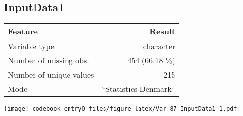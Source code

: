 \documentclass[]{article}
\newcommand{\fullline}{\noindent\makebox[\linewidth]{\rule{\textwidth}{0.4pt}}}
\newcommand{\bminione}{\begin{minipage}{0.75 \textwidth}}
\newcommand{\bminitwo}{\begin{minipage}{0.25 \textwidth}}
\newcommand{\emini}{\end{minipage}}
\begin{document}
\fullline

\hypertarget{inputdata1}{\subsection{InputData1}\label{inputdata1}}

\bminione

\begin{longtable}[]{@{}lr@{}}
\toprule
\begin{minipage}[b]{0.34\columnwidth}\raggedright\strut
Feature\strut
\end{minipage} & \begin{minipage}[b]{0.29\columnwidth}\raggedleft\strut
Result\strut
\end{minipage}\tabularnewline
\midrule
\endhead
\begin{minipage}[t]{0.34\columnwidth}\raggedright\strut
Variable type\strut
\end{minipage} & \begin{minipage}[t]{0.29\columnwidth}\raggedleft\strut
character\strut
\end{minipage}\tabularnewline
\begin{minipage}[t]{0.34\columnwidth}\raggedright\strut
Number of missing obs.\strut
\end{minipage} & \begin{minipage}[t]{0.29\columnwidth}\raggedleft\strut
454 (66.18 \%)\strut
\end{minipage}\tabularnewline
\begin{minipage}[t]{0.34\columnwidth}\raggedright\strut
Number of unique values\strut
\end{minipage} & \begin{minipage}[t]{0.29\columnwidth}\raggedleft\strut
215\strut
\end{minipage}\tabularnewline
\begin{minipage}[t]{0.34\columnwidth}\raggedright\strut
Mode\strut
\end{minipage} & \begin{minipage}[t]{0.29\columnwidth}\raggedleft\strut
``Statistics Denmark''\strut
\end{minipage}\tabularnewline
\bottomrule
\end{longtable}

\emini
\bminitwo
\texttt{[image: codebook\_entryQ\_files/figure-latex/Var-87-InputData1-1.pdf]}
\emini
\end{document}
